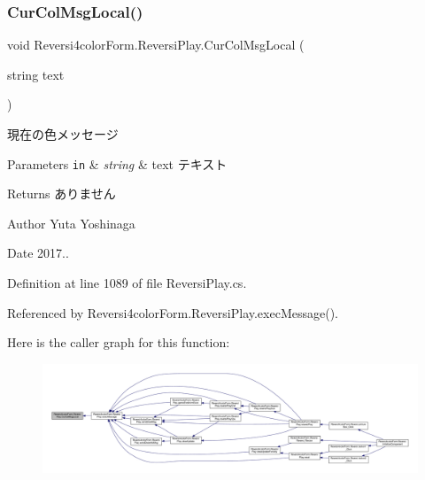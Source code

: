 \subsubsection{\texorpdfstring{Cur\+Col\+Msg\+Local()}{CurColMsgLocal()}}
{\footnotesize\ttfamily void Reversi4color\+Form.\+Reversi\+Play.\+Cur\+Col\+Msg\+Local (\begin{DoxyParamCaption}\item[{string}]{text }\end{DoxyParamCaption})\hspace{0.3cm}{\ttfamily [private]}}



現在の色メッセージ 


\begin{DoxyParams}[1]{Parameters}
\mbox{\tt in}  & {\em string} & text テキスト \\
\hline
\end{DoxyParams}
\begin{DoxyReturn}{Returns}
ありません 
\end{DoxyReturn}
\begin{DoxyAuthor}{Author}
Yuta Yoshinaga 
\end{DoxyAuthor}
\begin{DoxyDate}{Date}
2017.. 
\end{DoxyDate}


Definition at line 1089 of file Reversi\+Play.\+cs.



Referenced by Reversi4color\+Form.\+Reversi\+Play.\+exec\+Message().

Here is the caller graph for this function\+:\nopagebreak
\begin{figure}[H]
\begin{center}
\leavevmode
\includegraphics[width=350pt]{class_reversi4color_form_1_1_reversi_play_ad1e6152fe3e0730872789f838cef8aad_icgraph}
\end{center}
\end{figure}
\mbox{\label{class_reversi4color_form_1_1_reversi_play_ada1cd7e7bcfaadc34f40a59aee12aa50}} 
